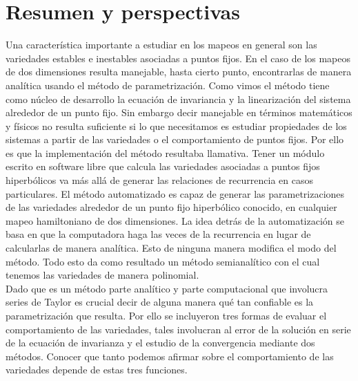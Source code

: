 
\chapter{Resumen y perspectivas}
Una característica importante a estudiar en los mapeos en general son las variedades estables e inestables asociadas a puntos fijos. En el caso de los mapeos de dos dimensiones resulta manejable, hasta cierto punto, encontrarlas de manera analítica usando el método de parametrización. Como vimos el método tiene como núcleo de desarrollo la ecuación de invariancia y la linearización del sistema alrededor de un punto fijo. Sin embargo decir manejable en términos matemáticos y físicos no resulta suficiente si lo que necesitamos es estudiar propiedades de los sistemas a partir de las variedades o el comportamiento de puntos fijos. Por ello es que la implementación del método resultaba llamativa. Tener un módulo escrito en software libre que calcula las variedades asociadas a puntos fijos hiperbólicos va más allá de generar las relaciones de recurrencia en casos particulares. El método automatizado es capaz de generar las parametrizaciones de las variedades alrededor de un punto fijo hiperbólico conocido, en cualquier mapeo hamiltoniano de dos dimensiones. La idea detrás de la automatización se basa en que la computadora haga las veces de la recurrencia en lugar de calcularlas de manera analítica. Esto de ninguna manera modifica el modo del método. Todo esto da como resultado un método semianalítico con el cual tenemos las variedades de manera polinomial. \\

Dado que es un método parte analítico y parte computacional que involucra series de Taylor es crucial decir de alguna manera qué tan confiable es la parametrización que resulta. Por ello se incluyeron tres formas de evaluar el comportamiento de las variedades, tales involucran al error de la solución en serie de la ecuación de invarianza y el estudio de la convergencia mediante dos métodos. Conocer que tanto podemos afirmar sobre el comportamiento de las variedades depende de estas tres funciones.\\


